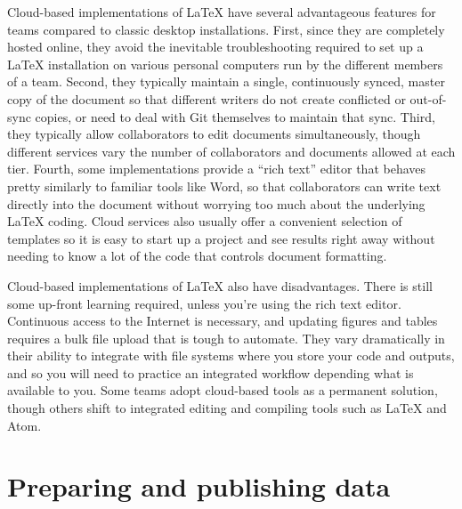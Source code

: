 Cloud-based implementations of {\LaTeX} have several advantageous features
for teams compared to classic desktop installations.
First, since they are completely hosted online,
they avoid the inevitable troubleshooting required to set up a {\LaTeX} installation
on various personal computers run by the different members of a team.
Second, they typically maintain a single, continuously synced, master copy of the document
so that different writers do not create conflicted or out-of-sync copies,
or need to deal with Git themselves to maintain that sync.
Third, they typically allow collaborators to edit documents simultaneously,
though different services vary the number of collaborators and documents allowed at each tier.
Fourth, some implementations provide a ``rich text'' editor
that behaves pretty similarly to familiar tools like Word,
so that collaborators can write text directly into the document without worrying too much
about the underlying {\LaTeX} coding.
Cloud services also usually offer a convenient selection of templates
so it is easy to start up a project and see results right away
without needing to know a lot of the code that controls document formatting.

Cloud-based implementations of {\LaTeX} also have disadvantages.
There is still some up-front learning required, unless you're using the rich text editor.
Continuous access to the Internet is necessary,
and updating figures and tables requires a bulk file upload that is tough to automate.
They vary dramatically in their ability to integrate
with file systems where you store your code and outputs,
and so you will need to practice an integrated workflow depending what is available to you.
Some teams adopt cloud-based tools as a permanent solution,
though others shift to integrated editing and compiling tools such as {\LaTeX} and Atom.


\section{Preparing and publishing data}

